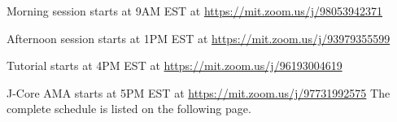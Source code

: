 \documentclass{article}
\begin{document}
Morning session starts at 9AM EST at        \url{https://mit.zoom.us/j/98053942371}


Afternoon session starts at 1PM EST at     \url{https://mit.zoom.us/j/93979355599}


Tutorial starts at 4PM EST at                        \url{https://mit.zoom.us/j/96193004619}


J-Core AMA starts at 5PM EST at                \url{https://mit.zoom.us/j/97731992575}
\newline
\newline
The complete schedule is listed on the following page.

\begin{table}[]

\centering
{}
\end{table}
\end{document}
